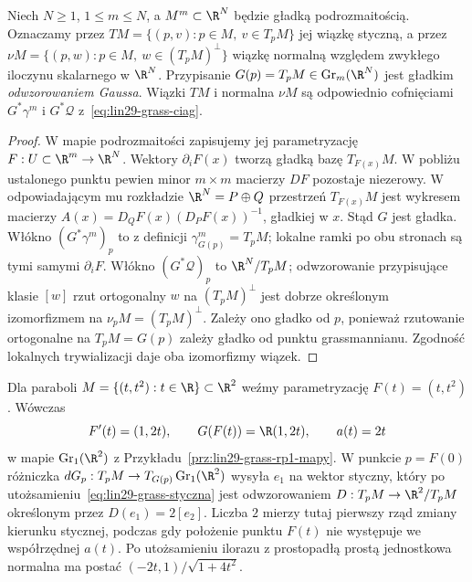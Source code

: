 \begin{twierdzenie}
\label{thm:lin29-grass-gauss}
Niech \(N\ge1\), \(1\le m\le N\), a
\(M^m\subset\R^N\) będzie gładką podrozmaitością.
Oznaczamy przez
\(TM=\{(p,v):p\in M,\ v\in T_pM\}\)
jej wiązkę styczną, a przez
\(\nu M=\{(p,w):p\in M,\ w\in(T_pM)^\perp\}\)
wiązkę normalną względem zwykłego
iloczynu skalarnego w \(\R^N\).
Przypisanie
$G(p)=T_pM\in\operatorname{Gr}_m(\R^N)$
jest gładkim \emph{odwzorowaniem Gaussa}. Wiązki
$TM$ i normalna $\nu M$ są odpowiednio
cofnięciami $G^*\gamma^m$ i $G^*\mathcal Q$
z~\eqref{eq:lin29-grass-ciag}.
\end{twierdzenie}
\begin{proof}
W mapie podrozmaitości zapisujemy jej parametryzację
$F:U\subset\R^m\to\R^N$. Wektory
$\partial_iF(x)$ tworzą gładką bazę $T_{F(x)}M$.
W pobliżu ustalonego punktu pewien minor $m\times m$
macierzy $DF$ pozostaje niezerowy. W odpowiadającym
mu rozkładzie $\R^N=P\oplus Q$ przestrzeń
$T_{F(x)}M$ jest wykresem macierzy
$A(x)=D_QF(x)(D_PF(x))^{-1}$,
gładkiej w $x$. Stąd $G$ jest gładka.
Włókno $(G^*\gamma^m)_p$ to z definicji
$\gamma^m_{G(p)}=T_pM$; lokalne ramki po obu
stronach są tymi samymi $\partial_iF$.
Włókno $(G^*\mathcal Q)_p$ to
$\R^N/T_pM$; odwzorowanie przypisujące klasie
$[w]$ rzut ortogonalny $w$ na $(T_pM)^\perp$
jest dobrze określonym izomorfizmem
na $\nu_pM=(T_pM)^\perp$. Zależy ono
gładko od $p$, ponieważ rzutowanie
ortogonalne na $T_pM=G(p)$
zależy gładko od punktu grassmannianu.
Zgodność lokalnych trywializacji daje oba
izomorfizmy wiązek.
\end{proof}

\begin{przyklad}
Dla paraboli $M=\{(t,t^2):t\in\R\}\subset\R^2$
weźmy parametryzację $F(t)=(t,t^2)$. Wówczas
\[
 F'(t)=(1,2t),\qquad
 G(F(t))=\R(1,2t),\qquad a(t)=2t
\]
w mapie $\operatorname{Gr}_1(\R^2)$ z
Przykładu~\ref{prz:lin29-grass-rp1-mapy}.
W punkcie $p=F(0)$ różniczka
$dG_p:T_pM\to T_{G(p)}\operatorname{Gr}_1(\R^2)$
wysyła $e_1$ na wektor styczny, który po
utożsamieniu~\eqref{eq:lin29-grass-styczna}
jest odwzorowaniem $D:T_pM\to\R^2/T_pM$
określonym przez $D(e_1)=2[e_2]$.
Liczba $2$ mierzy tutaj
pierwszy rząd zmiany kierunku stycznej, podczas gdy
położenie punktu $F(t)$ nie występuje we współrzędnej $a(t)$.
Po utożsamieniu ilorazu z prostopadłą prostą
jednostkowa normalna ma postać
$(-2t,1)/\sqrt{1+4t^2}$.
\end{przyklad}

